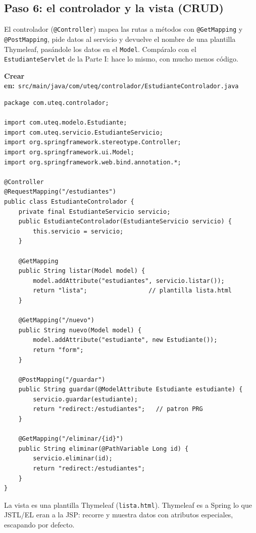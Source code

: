 \documentclass[11pt]{article}
\begin{document}
\subsection{Paso 6: el controlador y la vista (CRUD)}
El controlador (\texttt{@Controller}) mapea las rutas a métodos con \texttt{@Get\allowbreak{}Mapping} y \texttt{@Post\allowbreak{}Mapping}, pide datos al servicio y devuelve el nombre de una plantilla Thymeleaf, pasándole los datos en el \texttt{Model}. Compáralo con el \texttt{Estudiante\allowbreak{}Servlet} de la Parte I: hace lo mismo, con mucho menos código.

{\small\color{jwebazulo}\textbf{Crear en:}~}\texttt{src/\allowbreak{}main/\allowbreak{}java/\allowbreak{}com/\allowbreak{}uteq/\allowbreak{}controlador/\allowbreak{}Estudiante\allowbreak{}Controlador.\allowbreak{}java}\par\nobreak\vspace{-1pt}
\begin{cajacodigo}
\begin{lstlisting}[style=java]
package com.uteq.controlador;

import com.uteq.modelo.Estudiante;
import com.uteq.servicio.EstudianteServicio;
import org.springframework.stereotype.Controller;
import org.springframework.ui.Model;
import org.springframework.web.bind.annotation.*;

@Controller
@RequestMapping("/estudiantes")
public class EstudianteControlador {
    private final EstudianteServicio servicio;
    public EstudianteControlador(EstudianteServicio servicio) {
        this.servicio = servicio;
    }

    @GetMapping
    public String listar(Model model) {
        model.addAttribute("estudiantes", servicio.listar());
        return "lista";                 // plantilla lista.html
    }

    @GetMapping("/nuevo")
    public String nuevo(Model model) {
        model.addAttribute("estudiante", new Estudiante());
        return "form";
    }

    @PostMapping("/guardar")
    public String guardar(@ModelAttribute Estudiante estudiante) {
        servicio.guardar(estudiante);
        return "redirect:/estudiantes";   // patron PRG
    }

    @GetMapping("/eliminar/{id}")
    public String eliminar(@PathVariable Long id) {
        servicio.eliminar(id);
        return "redirect:/estudiantes";
    }
}
\end{lstlisting}
\end{cajacodigo}
\vspace{2pt}
La vista es una plantilla Thymeleaf (\texttt{lista.\allowbreak{}html}). Thymeleaf es a Spring lo que JSTL/EL eran a la JSP: recorre y muestra datos con atributos especiales, escapando por defecto.
\end{document}
